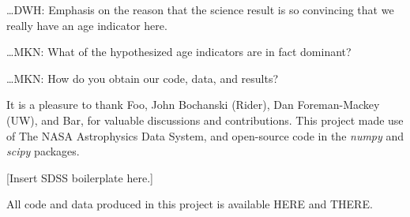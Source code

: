 \documentclass[12pt, preprint]{aastex}
\newcommand{\project}[1]{\textsl{#1}}
\begin{document}
\ldots DWH: Emphasis on the reason that the science result is so
convincing that we really have an age indicator here.

\ldots MKN: What of the hypothesized age indicators are in fact
dominant?

\ldots MKN: How do you obtain our code, data, and results?

\acknowledgments
It is a pleasure to thank
  Foo,
  John Bochanski (Rider),
  Dan Foreman-Mackey (UW), and
  Bar,
for valuable discussions and contributions.
This project made use of
  The NASA Astrophysics Data System,
  and open-source code in the \project{numpy} and \project{scipy} packages.

[Insert SDSS boilerplate here.]

All code and data produced in this project is available HERE and THERE.


\end{document}
